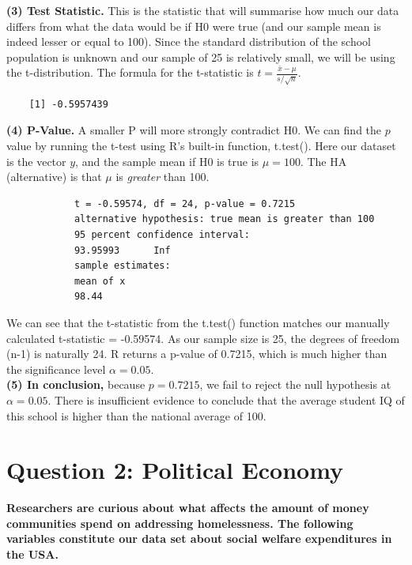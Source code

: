 \documentclass[12pt,letterpaper]{article}
\begin{document}
\begin{enumerate}
	\textbf{(3) Test Statistic.} This is the statistic that will summarise how much our data differs from what the data would be if H0 were true (and our sample mean is indeed lesser or equal to 100). Since the standard distribution of the school population is unknown and our sample of 25 is relatively small, we will be using the t-distribution. The formula for the t-statistic is $t = \frac{\bar{x} - \mu}{s / \sqrt{n}}$.
			
\begin{verbatim}
	[1] -0.5957439
\end{verbatim}

	\textbf{(4) P-Value.} A smaller P will more strongly contradict H0. We can find the $p$ value by running the t-test using R's built-in function, t.test(). Here our dataset is the vector $y$, and the sample mean if H0 is true is $\mu = 100$. The HA (alternative) is that $\mu$ is \textit{greater} than 100.
			  
			\begin{verbatim}
			t = -0.59574, df = 24, p-value = 0.7215
			alternative hypothesis: true mean is greater than 100
			95 percent confidence interval:
			93.95993      Inf
			sample estimates:
			mean of x 
			98.44 
			\end{verbatim}
		We can see that the t-statistic from the t.test() function matches our manually calculated t-statistic = -0.59574. As our sample size is 25, the degrees of freedom (n-1) is naturally 24. R returns a p-value of 0.7215, which is much higher than the significance level $\alpha = 0.05.$	\\
		
	\textbf{(5) In conclusion,} because $p = 0.7215$, we fail to reject the null hypothesis at $\alpha = 0.05$. There is insufficient evidence to conclude that the average student IQ of this school is higher than the national average of 100.
	
\end{enumerate}

\newpage

	\section*{Question 2: Political Economy}

\noindent \textbf{Researchers are curious about what affects the amount of money communities spend on addressing homelessness. The following variables constitute our data set about social welfare expenditures in the USA.}\\
\vspace{.5cm}
\end{document}
